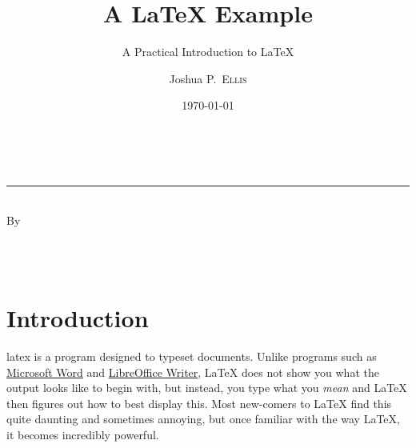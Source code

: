 \documentclass[
  a4paper,             %
  11pt,                %
  oneside,             %
  onecolumn,           %
  bibliography=totoc,  %
  final,               %
]{scrartcl}
\title{A \texorpdfstring{\LaTeX}{LaTeX} Example}
\subtitle{A Practical Introduction to \texorpdfstring{\LaTeX}{LaTeX}}
\author{Joshua P.~\textsc{Ellis}}
\date{\today}
\makeatletter
\newcommand\@degreetitle{}
\newcommand\@department{}
\newcommand\@university{}
\makeatother
\begin{document}

\pagestyle{empty}

\begin{titlepage}
  \makeatletter
  \begin{center}
    \vspace*{2.5cm}

    {\Huge \@title} \\[0em]
    \rule{\linewidth}{2pt}
    {\huge \textsc{\@subtitle}} \\[6em]

    {\large By} \\[1cm]
    {\huge \@author} \\[0.5ex]
    {\Large \normalfont \@degreetitle}

    \vfill

    {\Large \@department} \\[1ex]
    {\Large \@university}

    \vfill

    {\large \@date}
  \end{center}

\makeatother
\end{titlepage}

\cleardoublepage
\pagestyle{plain}

\tableofcontents

\cleardoublepage
\pagestyle{headings}

\section{Introduction}
\label{sec:introduction}

\gls{latex} is a program designed to typeset documents.  Unlike programs such as
\href{http://office.microsoft.com/en-au/word/}{Microsoft Word} and
\href{http://www.libreoffice.org/discover/writer/}{Libre\-Office Writer},
\LaTeX{} does not show you what the output looks like to begin with, but
instead, you type what you \emph{mean} and \LaTeX{} then figures out how to best
display this.  Most new-comers to \LaTeX{} find this quite daunting and
sometimes annoying, but once familiar with the way \LaTeX{}, it becomes
incredibly powerful.
\end{document}
